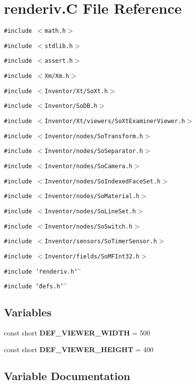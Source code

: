 \section{renderiv.C File Reference}
\label{renderiv_C}
{\tt \#include $<$math.h$>$}\par
{\tt \#include $<$stdlib.h$>$}\par
{\tt \#include $<$assert.h$>$}\par
{\tt \#include $<$Xm/Xm.h$>$}\par
{\tt \#include $<$Inventor/Xt/So\-Xt.h$>$}\par
{\tt \#include $<$Inventor/So\-DB.h$>$}\par
{\tt \#include $<$Inventor/Xt/viewers/So\-Xt\-Examiner\-Viewer.h$>$}\par
{\tt \#include $<$Inventor/nodes/So\-Transform.h$>$}\par
{\tt \#include $<$Inventor/nodes/So\-Separator.h$>$}\par
{\tt \#include $<$Inventor/nodes/So\-Camera.h$>$}\par
{\tt \#include $<$Inventor/nodes/So\-Indexed\-Face\-Set.h$>$}\par
{\tt \#include $<$Inventor/nodes/So\-Material.h$>$}\par
{\tt \#include $<$Inventor/nodes/So\-Line\-Set.h$>$}\par
{\tt \#include $<$Inventor/nodes/So\-Switch.h$>$}\par
{\tt \#include $<$Inventor/sensors/So\-Timer\-Sensor.h$>$}\par
{\tt \#include $<$Inventor/fields/So\-MFInt32.h$>$}\par
{\tt \#include \char`\"{}renderiv.h\char`\"{}}\par
{\tt \#include \char`\"{}defs.h\char`\"{}}\par
\subsection*{Variables}
\begin{CompactItemize}
\item 
const short {\bf DEF\_\-VIEWER\_\-WIDTH} = 500
\item 
const short {\bf DEF\_\-VIEWER\_\-HEIGHT} = 400
\end{CompactItemize}


\subsection{Variable Documentation}
